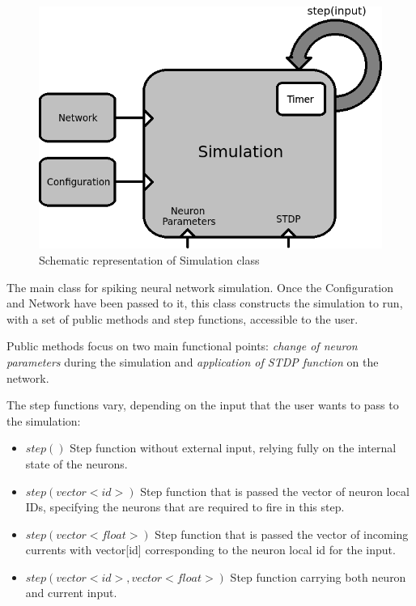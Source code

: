 \begin{figure}[h!]
\begin{center}
\includegraphics[scale = 0.7]{images/background/simulation_scheme.png}
\end{center}
\caption{Schematic representation of Simulation class}
\end{figure}


The main class for spiking neural network simulation. Once the Configuration and Network have been passed to it, this class constructs the simulation to run, with a set of public methods and step functions, accessible to the user.

Public methods focus on two main functional points: \emph{change of neuron parameters} during the simulation and \emph{application of STDP function} on the network.

The step functions vary, depending on the input that the user wants to pass to the simulation:

\begin{itemize}
\item{$step()$} Step function without external input, relying fully on the internal state of the neurons.
\item{$step(vector<id>)$} Step function that is passed the vector of neuron local IDs, specifying the neurons that are required to fire in this step.
\item{$step(vector<float>)$} Step function that is passed the vector of incoming currents with vector[id] corresponding to the neuron local id for the input.
\item{$step(vector<id>, vector<float>)$} Step function carrying both neuron and current input.
\end{itemize}

